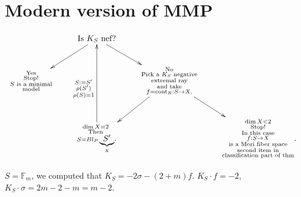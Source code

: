 \section{Modern version of MMP}
\label{section-modern-mmp}


$$
\xymatrix{
&\text{Is $K_S$ nef?}
\ar[dl]\ar[dr]\\
\substack{\text{Yes} \\ \text{Stop!}\\
\text{$S$ is a minimal}\\\text{model}}
&  &
\substack{\text{No} \\
\text{Pick a $K_S$ negative}\\
\text{extremal ray}\\
\text{and take}\\
f=\text{cont}_R:S \to X.}
\ar[dr]\ar[dl]\\
&
\substack{\dim X=2 \\
\text{Then} \\
S=Bl_P\underbrace{S'}_{X}}
\ar[uu]^{\substack{S:=S' \\
\rho(S')\\
\rho(S)=1}}.
&&
\substack{\dim X <2 \\
\text{Stop!}\\
\text{In this case}\\
f:S \to X\\
\text{is a Mori fiber space}\\
\text{second item in}\\
\text{classification part of thm}}.
}
$$


\begin{example}
\label{example-hirzebruch}
$S=\mathbb{F}_m$,
we computed that $K_S=-2\sigma -(2+m)f$.
$K_S\cdot f=-2$,
$K_S\cdot \sigma = 2m-2-m=m-2$.
\end{example}


